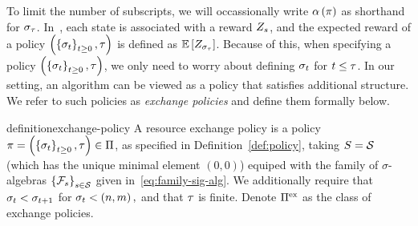 To limit the number of subscripts, we will occassionally write
$\alpha\left(\pi\right)$ as shorthand for 
$\sigma_{\tau}$.
In~\citet{mandelbaum1981optimal}, each state is associated with a reward $Z_{s}$, and the expected 
reward of a policy 
\(
    \left(
        \left\{
            \sigma_t
        \right\}_{t\geq 0},
        \tau
    \right)
\)
is defined as
\(
    \mathbb{E}\left[
        Z_{
            \sigma_{
                \tau
            }
        }
    \right]
\).
Because of this, when specifying a policy 
\(
    \left(
        \left\{
            \sigma_{t}
        \right\}_{t\geq 0},
        \tau 
    \right)
\),
we only need to worry about defining $\sigma_{t}$ for $t\leq\tau$.
In our setting, an algorithm can be viewed as a policy that satisfies additional structure. We refer to such policies as \emph{exchange policies} and define them formally below.




\begin{restatable}{definition}{exchange-policy}
    \label{def:exchange-policy} 
    A resource exchange policy
    is a policy 
    \(
        \pi=
        \left(
            \left\{
                \sigma_{t}
            \right\}_{t\geq 0},
            \tau 
        \right)
        \in
        \Pi
    \),
    as specified in Definition~\ref{def:policy}, taking
    \(
        S=\mathcal{S}
    \)
    (which has the unique minimal element $(0,0)$)
    equiped with the family of $\sigma$-algebras 
    \(
        \left\{
            \mathcal{F}_{s}
        \right\}_{s\in\mathcal{S}}
    \)
    given in~\eqref{eq:family-sig-alg}. We additionally require that
    \(
        \sigma_{t} < \sigma_{t+1}
    \)
    for
    \(
        \sigma_{t} < \left(
            n,m
        \right),
    \)
    and that $\tau$ is finite.
    Denote $\Pi^{\text{ex}}$ as the class of exchange policies.
\end{restatable}  

